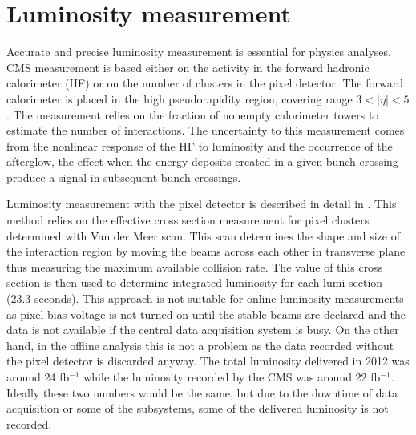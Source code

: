 \section{Luminosity measurement}
\label{sec:lumi}

Accurate and precise luminosity measurement is essential for physics analyses. CMS measurement is based either on the activity in the forward hadronic calorimeter (HF) or on the number of clusters in the pixel detector.
The forward calorimeter is placed in the high pseudorapidity region, covering range $3<|\eta|<5$. The measurement relies on the fraction of nonempty calorimeter towers to estimate the number of interactions. The uncertainty to this measurement comes from the nonlinear response of the HF to luminosity and the occurrence of the afterglow, the effect when the energy deposits created in a given bunch crossing produce a signal in subsequent bunch crossings. 
\par Luminosity measurement with the pixel detector is described in detail in \cite{CMS-PAS-SMP-12-008,CMS:2013gfa}. This method relies on the effective cross section measurement for pixel clusters determined with Van der Meer scan. This scan determines the shape and size of the interaction region by moving the beams across each other in transverse plane thus measuring the maximum available collision rate. The value of this cross section is then used to determine integrated luminosity for each lumi-section (23.3 seconds). This approach is not suitable for online luminosity measurements as pixel bias voltage is not turned on until the stable beams are declared and the data is not available if the central data acquisition system is busy. On the other hand, in the offline analysis this is not a problem as the data recorded without the pixel detector is discarded anyway.    
The total luminosity delivered in 2012 was around 24 fb$^{-1}$ while the luminosity recorded by the CMS was around 22 fb$^{-1}$. Ideally these two numbers would be the same, but due to the downtime of data acquisition or some of the subsystems, some of the delivered luminosity is not recorded. 